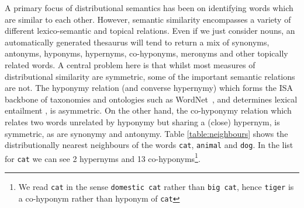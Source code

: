 \documentclass[11pt]{article}
\begin{document}
A primary focus of distributional semantics has been on identifying words which are similar to each other. However, semantic similarity encompasses a variety of different lexico-semantic and topical relations.  Even if we just consider nouns, an automatically generated thesaurus will tend to return a mix of synonyms, antonyms, hyponyms, hypernyms, co-hyponyms, meronyms and other topically related words.  A central problem here is that whilst most measures of distributional similarity are symmetric, some of the important semantic relations are not.  The hyponymy relation (and converse hypernymy) which forms the ISA backbone of taxonomies and ontologies such as WordNet~\cite{Fellbaum:98}, and determines lexical entailment \cite{Geffet2005}, is asymmetric. On the other hand, the co-hyponymy relation which relates two words unrelated by hyponymy but sharing a (close) hypernym, is symmetric, as are synonymy and antonymy. Table \ref{table:neighbours} shows the distributionally nearest neighbours of the words \texttt{cat}, \texttt{animal} and \texttt{dog}. %
In the list for \texttt{cat} we can see 2 hypernyms and 13 co-hyponyms\footnote{We read \texttt{cat} in the sense \texttt{domestic cat} rather than \texttt{big cat}, hence \texttt{tiger} is a co-hyponym rather than hyponym of \texttt{cat}}. 
\end{document}
